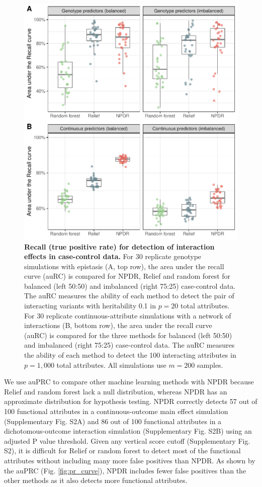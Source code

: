 \documentclass{bioinfo}
\begin{document}
\begin{figure}[H]
\centerline{\includegraphics[scale = 0.55, clip]{../../figs/auRC.pdf}}
\caption{{\bf Recall (true positive rate) for detection of interaction effects in case-control data.} For 30 replicate genotype simulations with epistasis (A, top row), the area under the recall curve (auRC) is compared for NPDR, Relief and random forest for balanced (left 50:50) and  imbalanced (right 75:25) case-control data. The auRC measures the ability of each method to detect the pair of interacting variants with heritability 0.1 in $p=20$ total attributes. For 30 replicate continuous-attribute simulations with a network of interactions (B, bottom row), the area under the recall curve (auRC) is compared for the three methods for balanced (left 50:50) and  imbalanced (right 75:25) case-control data. The auRC measures the ability of each method to detect the 100 interacting attributes in $p=1,000$ total attributes. All simulations use $m = 200$ samples.}
\label{fig:rc_curve}
\end{figure}

We use auPRC to compare other machine learning methods with NPDR because Relief and random forest lack a null distribution, whereas NPDR has an approximate distribution for hypothesis testing.
NPDR correctly detects 57 out of 100 functional attributes in a continuous-outcome main effect simulation (Supplementary Fig. S2A) and 86 out of 100 functional attributes in a dichotomous-outcome interaction simulation (Supplementary Fig. S2B) using an adjusted P value threshold.
Given any vertical score cutoff (Supplementary Fig. S2), it is difficult for Relief or random forest to detect most of the functional attributes without including many more false positives than NPDR.
As shown by the auPRC (Fig. \ref{fig:pr_curve}), NPDR includes fewer false positives than the other methods as it also detects more functional attributes.
\end{document}
